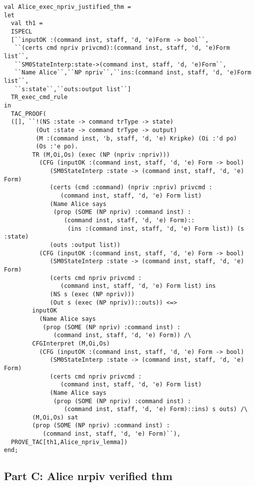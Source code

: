 \documentclass{article}
\begin{document}
\begin{verbatim}
val Alice_exec_npriv_justified_thm =
let
  val th1 =
  ISPECL
  [``inputOK :(command inst, staff, 'd, 'e)Form -> bool``,
   ``(certs cmd npriv privcmd):(command inst, staff, 'd, 'e)Form list``,
   ``SM0StateInterp:state->(command inst, staff, 'd, 'e)Form``,
   ``Name Alice``,``NP npriv``,``ins:(command inst, staff, 'd, 'e)Form list``,
   ``s:state``,``outs:output list``]
  TR_exec_cmd_rule
in
  TAC_PROOF(
  ([], ``!(NS :state -> command trType -> state)
         (Out :state -> command trType -> output)
         (M :(command inst, 'b, staff, 'd, 'e) Kripke) (Oi :'d po)
         (Os :'e po).
        TR (M,Oi,Os) (exec (NP (npriv :npriv)))
          (CFG (inputOK :(command inst, staff, 'd, 'e) Form -> bool)
             (SM0StateInterp :state -> (command inst, staff, 'd, 'e) Form)
             (certs (cmd :command) (npriv :npriv) privcmd :
                (command inst, staff, 'd, 'e) Form list)
             (Name Alice says
              (prop (SOME (NP npriv) :command inst) :
                 (command inst, staff, 'd, 'e) Form)::
                  (ins :(command inst, staff, 'd, 'e) Form list)) (s :state)
             (outs :output list))
          (CFG (inputOK :(command inst, staff, 'd, 'e) Form -> bool)
             (SM0StateInterp :state -> (command inst, staff, 'd, 'e) Form)
             (certs cmd npriv privcmd :
                (command inst, staff, 'd, 'e) Form list) ins
             (NS s (exec (NP npriv)))
             (Out s (exec (NP npriv))::outs)) <=>
        inputOK
          (Name Alice says
           (prop (SOME (NP npriv) :command inst) :
              (command inst, staff, 'd, 'e) Form)) /\
        CFGInterpret (M,Oi,Os)
          (CFG (inputOK :(command inst, staff, 'd, 'e) Form -> bool)
             (SM0StateInterp :state -> (command inst, staff, 'd, 'e) Form)
             (certs cmd npriv privcmd :
                (command inst, staff, 'd, 'e) Form list)
             (Name Alice says
              (prop (SOME (NP npriv) :command inst) :
                 (command inst, staff, 'd, 'e) Form)::ins) s outs) /\
        (M,Oi,Os) sat
        (prop (SOME (NP npriv) :command inst) :
           (command inst, staff, 'd, 'e) Form)``),
  PROVE_TAC[th1,Alice_npriv_lemma])
end;
\end{verbatim}

\subsection{Part C: Alice nrpiv verified thm}
\label{sec:part-c:-alice}
\end{document}
